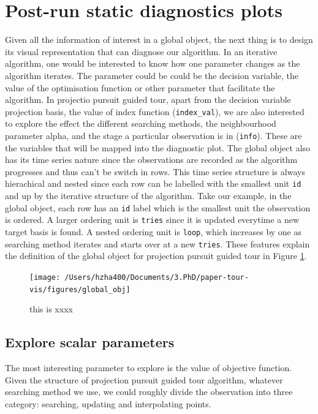 \documentclass[12pt]{article}
\begin{document}
\hypertarget{post-run-static-diagnostics-plots}{%
\section{Post-run static diagnostics
plots}\label{post-run-static-diagnostics-plots}}

Given all the information of interest in a global object, the next thing
is to design its visual representation that can diagnose our algorithm.
In an iterative algorithm, one would be interested to know how one
parameter changes as the algorithm iterates. The parameter could be
could be the decision variable, the value of the optimisation function
or other parameter that facilitate the algorithm. In projectio pursuit
guided tour, apart from the decision variable projection basis, the
value of index function (\texttt{index\_val}), we are also interested to
explore the effect the different searching methods, the neighbourhood
parameter alpha, and the stage a particular observation is in
(\texttt{info}). These are the variables that will be mapped into the
diagnostic plot. The global object also has its time series nature since
the observations are recorded as the algorithm progresses and thus can't
be switch in rows. This time series structure is always hierachical and
nested since each row can be labelled with the smallest unit \texttt{id}
and up by the iterative structure of the algorithm. Take our example, in
the global object, each row has an \texttt{id} label which is the
smallest unit the observation is ordered. A larger ordering unit is
\texttt{tries} since it is updated everytime a new target basis is
found. A nested ordering unit is \texttt{loop}, which increases by one
as searching method iterates and starts over at a new \texttt{tries}.
These features explain the definition of the global object for
projection pursuit guided tour in Figure \ref{fig:glb-obj}.

\begin{figure}
\texttt{[image: /Users/hzha400/Documents/3.PhD/paper-tour-vis/figures/global\_obj]} \caption{\label{glb-obj}this is xxxx}\label{fig:glb-obj}
\end{figure}

\hypertarget{explore-scalar-parameters}{%
\subsection{Explore scalar parameters}\label{explore-scalar-parameters}}

The most interesting parameter to explore is the value of objective
function. Given the structure of projection pursuit guided tour
algorithm, whatever searching method we use, we could roughly divide the
observation into three category: searching, updating and interpolating
points.
\end{document}
